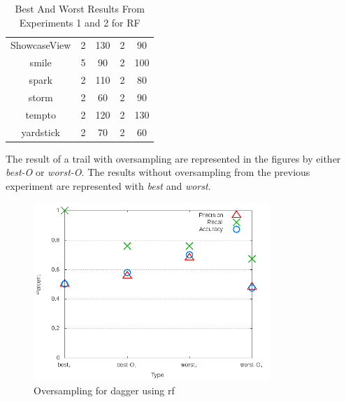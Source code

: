 \begin{table}[ht]
\begin{center}
\begin{tabular}{|c|c|c|c|c|}
        ShowcaseView & 2 & 130 & 2 & 90 \\
        smile & 5 & 90 & 2 & 100 \\
        spark & 2 & 110 & 2 & 80 \\
        storm & 2 & 60 & 2 & 90 \\
        tempto & 2 & 120 & 2 & 130 \\
        yardstick & 2 & 70 & 2 & 60 \\
        \hline
    \end{tabular}
    \caption{Best And Worst Results From Experiments 1 and 2 for RF}
    \label{tab:rf_best_worst_swr_experiment_sets}
\end{center}
\end{table}

The result of a trail with oversampling are represented in the figures by either \textit{best-O} or \textit{worst-O}. The results without oversampling from the previous experiment are represented with \textit{best} and \textit{worst}.


\begin{figure}[!ht]
    \centering
        \includegraphics[width=0.8\textwidth]{images/rf/test_4/dagger_sample_range}
        \caption{Oversampling for dagger using \gls{rf}}
        \label{fig:test_4_dagger_rf}
\end{figure}

